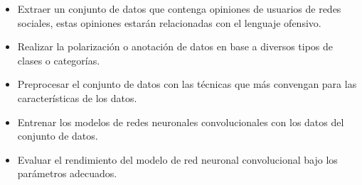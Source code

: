 \begin{itemize}
	\item Extraer un conjunto de datos que contenga opiniones de usuarios de redes sociales, estas opiniones estarán relacionadas con el lenguaje ofensivo.
	\item Realizar la polarización o anotación de datos en base a diversos tipos de clases o categorías.
	\item Preprocesar el conjunto de datos con las técnicas que más convengan para las características de los datos.
	\item Entrenar los modelos de redes neuronales convolucionales con los datos del conjunto de datos.
	\item Evaluar el rendimiento del modelo de red neuronal convolucional bajo los parámetros adecuados.
\end{itemize}